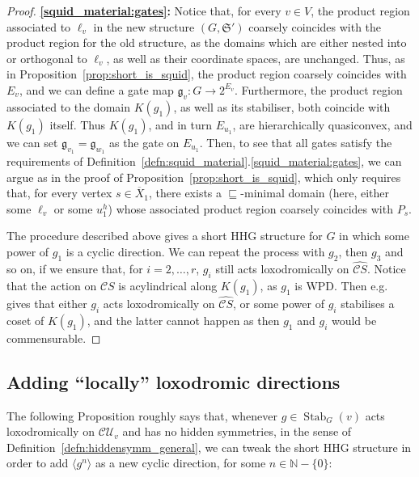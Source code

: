 \documentclass[svgnames]{amsart}
\theoremstyle{plain}
\theoremstyle{definition}
\newcommand{\frakS}{\mathfrak S}
\newcommand{\C}{\mathcal C}
\newcommand{\ov}[1]{\overline{#1}}
\newcommand{\U}{\mathcal{U}}
\newcommand{\nest}{\sqsubseteq}
\newcommand{\Stab}[2]{\operatorname{Stab}_{#1}(#2)}
\newcommand{\gate}{\mathfrak{g}}
\newcommand{\h}{\widehat}
\begin{document}
\begin{proof}
\textbf{\eqref{squid_material:gates}:}  Notice that, for every $v\in V$, the product region associated to $\ell_v$ in the new structure $(G,\frakS')$ coarsely coincides with the product region for the old structure, as the domains which are either nested into or orthogonal to $\ell_v$, as well as their coordinate spaces, are unchanged. Thus, as in Proposition~\ref{prop:short_is_squid}, the product region coarsely coincides with $E_v$, and we can define a gate map $\gate_v\colon G\to 2^{E_v}$. Furthermore, the product region associated to the domain $K(g_1)$, as well as its stabiliser, both coincide with $K(g_1)$ itself. Thus $K(g_1)$, and in turn $E_{u_1}$, are hierarchically quasiconvex, and we can set $\gate_{v_1}=\gate_{w_1}$ as the gate on $E_{u_1}$. Then, to see that all gates satisfy the requirements of Definition~\ref{defn:squid_material}.\eqref{squid_material:gates}, we can argue as in the proof of Proposition~\ref{prop:short_is_squid}, which only requires that, for every vertex $s\in\ov{X}_1$, there exists a $\nest$-minimal domain (here, either some $\ell_v$ or some $u^h_1$) whose associated product region coarsely coincides with $P_s$.

\par\medskip
The procedure described above gives a short HHG structure for $G$ in which some power of $g_1$ is a cyclic direction. We can repeat the process with $g_2$, then $g_3$ and so on, if we ensure that, for $i=2,\ldots, r$, $g_i$ still acts loxodromically on $\h{\C S}$. Notice that the action on $\C S$ is acylindrical along $K(g_1)$, as $g_1$ is WPD. Then e.g. \cite[Corollary 6.15]{abbott_manning} gives that either $g_i$ acts loxodromically on $\h{\C S}$, or some power of $g_i$ stabilises a coset of $K(g_1)$, and the latter cannot happen as then $g_1$ and $g_i$ would be commensurable. 
\end{proof}





\subsection{Adding ``locally'' loxodromic directions}
The following Proposition roughly says that, whenever $g\in \Stab{G}{v}$ acts loxodromically on $\C\U_v$ and has no hidden symmetries, in the sense of Definition~\ref{defn:hiddensymm_general}, we can tweak the short HHG structure in order to add $\langle g^n\rangle$ as a new cyclic direction, for some $n\in \mathbb N-\{0\}$:
\end{document}
